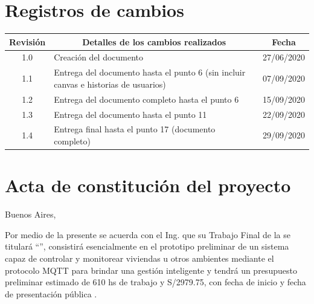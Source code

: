 \documentclass[11pt]{charter}
\begin{document}
\maketitle
\thispagestyle{empty}
\pagebreak


\thispagestyle{empty}
{\setlength{\parskip}{0pt}
\tableofcontents{}
}
\pagebreak


\section{Registros de cambios}
\label{sec:registro}


\begin{table}[ht]
\label{tab:registro}
\centering
\begin{tabularx}{\linewidth}{@{}|c|X|c|@{}}
\hline
\rowcolor[HTML]{C0C0C0} 
Revisión & \multicolumn{1}{c|}{\cellcolor[HTML]{C0C0C0}Detalles de los cambios realizados} & Fecha      \\ \hline
1.0      & Creación del documento                                          & 27/06/2020 \\ \hline
1.1      & Entrega del documento hasta el punto 6 \newline
			(sin incluir canvas e historias de usuarios)            & 07/09/2020 \\ \hline
1.2      & Entrega del documento completo hasta el punto 6          & 15/09/2020 \\ \hline
1.3      & Entrega del documento hasta el punto 11  & 22/09/2020 \\ \hline
1.4      & Entrega final hasta el punto 17 \newline
			(documento completo)
 & 29/09/2020 \\ \hline
\end{tabularx}
\end{table}

\pagebreak



\section{Acta de constitución del proyecto}
\label{sec:acta}

\begin{flushright}
Buenos Aires, \fechaInicioName
\end{flushright}

\vspace{2cm}

Por medio de la presente se acuerda con el Ing. \authorname\hspace{1px} que su Trabajo Final de la \degreename\hspace{1px} se titulará ``\ttitle'', consistirá esencialmente en el prototipo preliminar de un sistema capaz de controlar y monitorear viviendas u otros ambientes mediante el protocolo MQTT para brindar una gestión inteligente y tendrá un presupuesto preliminar estimado de 610 hs de trabajo y S/2979.75, con fecha de inicio \fechaInicioName\hspace{1px} y fecha de presentación pública \fechaFinalName.
\end{document}
